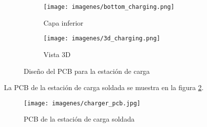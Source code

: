 \begin{figure}[H]
    \centering
    \begin{subfigure}{0.9\linewidth}
        \centering
        \texttt{[image: imagenes/bottom\_charging.png]}
        \caption{Capa inferior}
    \end{subfigure}
    \vfill
    \begin{subfigure}{0.9\linewidth}
        \centering
        \texttt{[image: imagenes/3d\_charging.png]}
        \caption{Vista 3D}
    \end{subfigure}
    \caption{Diseño del PCB para la estación de carga}
    \label{fig:pcb_estacion_carga}
\end{figure}

La PCB de la estación de carga soldada se muestra en la figura \ref{fig:pcb_estacion_carga_soldada}.

\begin{figure}[H]
    \centering
    \texttt{[image: imagenes/charger\_pcb.jpg]}
    \caption{PCB de la estación de carga soldada}
    \label{fig:pcb_estacion_carga_soldada}
\end{figure}